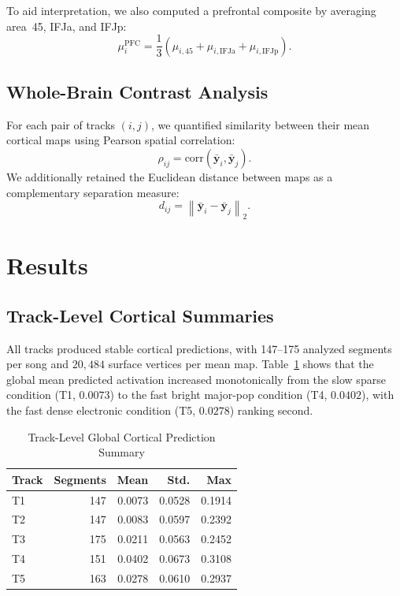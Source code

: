 \documentclass[conference]{IEEEtran}
\begin{document}
To aid interpretation, we also computed a prefrontal composite by averaging area~45, IFJa, and IFJp:
\begin{equation}
\mu^{\text{PFC}}_i = \frac{1}{3}\left(\mu_{i,45} + \mu_{i,\mathrm{IFJa}} + \mu_{i,\mathrm{IFJp}}\right).
\label{eq:pfc}
\end{equation}

\subsection{Whole-Brain Contrast Analysis}

For each pair of tracks $(i,j)$, we quantified similarity between their mean cortical maps using Pearson spatial correlation:
\begin{equation}
\rho_{ij} = \mathrm{corr}\left(\bar{\mathbf{y}}_i,\bar{\mathbf{y}}_j\right).
\label{eq:corr}
\end{equation}
We additionally retained the Euclidean distance between maps as a complementary separation measure:
\begin{equation}
d_{ij} = \left\lVert \bar{\mathbf{y}}_i - \bar{\mathbf{y}}_j \right\rVert_2.
\label{eq:l2}
\end{equation}

\section{Results}
\label{sec:results}

\subsection{Track-Level Cortical Summaries}

All tracks produced stable cortical predictions, with 147--175 analyzed segments per song and $20{,}484$ surface vertices per mean map. Table~\ref{tab:global} shows that the global mean predicted activation increased monotonically from the slow sparse condition (T1, $0.0073$) to the fast bright major-pop condition (T4, $0.0402$), with the fast dense electronic condition (T5, $0.0278$) ranking second.

\begin{table}[t]
\centering
\caption{Track-Level Global Cortical Prediction Summary}
\label{tab:global}
\begin{tabular}{lrrrr}
\toprule
\textbf{Track} & \textbf{Segments} & \textbf{Mean} & \textbf{Std.} & \textbf{Max} \\
\midrule
T1 & 147 & 0.0073 & 0.0528 & 0.1914 \\
T2 & 147 & 0.0083 & 0.0597 & 0.2392 \\
T3 & 175 & 0.0211 & 0.0563 & 0.2452 \\
T4 & 151 & 0.0402 & 0.0673 & 0.3108 \\
T5 & 163 & 0.0278 & 0.0610 & 0.2937 \\
\bottomrule
\end{tabular}
\end{table}
\end{document}
